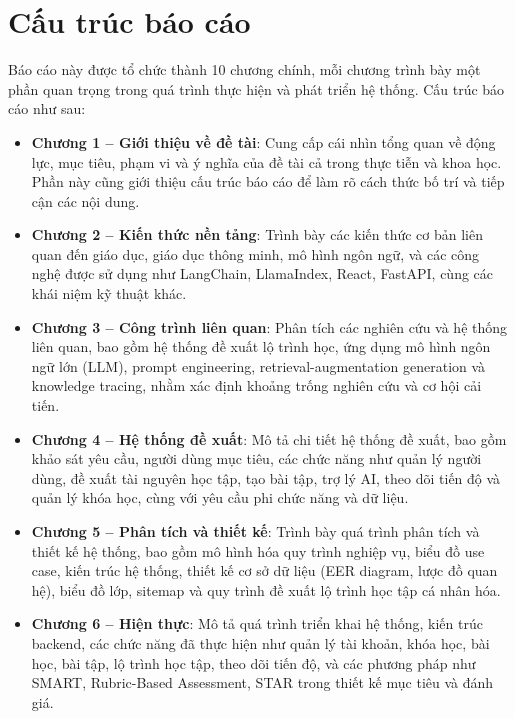 \section{Cấu trúc báo cáo}

Báo cáo này được tổ chức thành 10 chương chính, mỗi chương trình bày một phần quan trọng trong quá trình thực hiện và phát triển hệ thống. Cấu trúc báo cáo như sau:

\begin{itemize}
    \item \textbf{Chương 1 – Giới thiệu về đề tài}: Cung cấp cái nhìn tổng quan về động lực, mục tiêu, phạm vi và ý nghĩa của đề tài cả trong thực tiễn và khoa học. Phần này cũng giới thiệu cấu trúc báo cáo để làm rõ cách thức bố trí và tiếp cận các nội dung.
    
    \item \textbf{Chương 2 – Kiến thức nền tảng}: Trình bày các kiến thức cơ bản liên quan đến giáo dục, giáo dục thông minh, mô hình ngôn ngữ, và các công nghệ được sử dụng như LangChain, LlamaIndex, React, FastAPI, cùng các khái niệm kỹ thuật khác.
    
    \item \textbf{Chương 3 – Công trình liên quan}: Phân tích các nghiên cứu và hệ thống liên quan, bao gồm hệ thống đề xuất lộ trình học, ứng dụng mô hình ngôn ngữ lớn (LLM), prompt engineering, retrieval-augmentation generation và knowledge tracing, nhằm xác định khoảng trống nghiên cứu và cơ hội cải tiến.
    
    \item \textbf{Chương 4 – Hệ thống đề xuất}: Mô tả chi tiết hệ thống đề xuất, bao gồm khảo sát yêu cầu, người dùng mục tiêu, các chức năng như quản lý người dùng, đề xuất tài nguyên học tập, tạo bài tập, trợ lý AI, theo dõi tiến độ và quản lý khóa học, cùng với yêu cầu phi chức năng và dữ liệu.
    
    \item \textbf{Chương 5 – Phân tích và thiết kế}: Trình bày quá trình phân tích và thiết kế hệ thống, bao gồm mô hình hóa quy trình nghiệp vụ, biểu đồ use case, kiến trúc hệ thống, thiết kế cơ sở dữ liệu (EER diagram, lược đồ quan hệ), biểu đồ lớp, sitemap và quy trình đề xuất lộ trình học tập cá nhân hóa.
    
    \item \textbf{Chương 6 – Hiện thực}: Mô tả quá trình triển khai hệ thống, kiến trúc backend, các chức năng đã thực hiện như quản lý tài khoản, khóa học, bài học, bài tập, lộ trình học tập, theo dõi tiến độ, và các phương pháp như SMART, Rubric-Based Assessment, STAR trong thiết kế mục tiêu và đánh giá.
    

\end{itemize}
